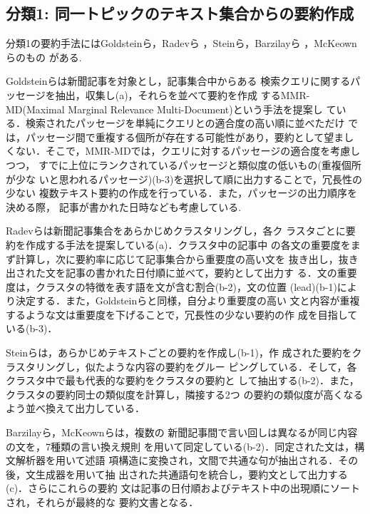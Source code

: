 \subsection*{分類1: 同一トピックのテキスト集合からの要約作成}

分類1の要約手法にはGoldsteinら\cite{goldstein:00:a}，Radevら
\cite{radev:00:a}，Steinら\cite{stein:99:a}，Barzilayら
\cite{barzilay:99:a,barzilay:01:a}，McKeownら\cite{mckeown:99:a}のもの
がある.

Goldsteinら\cite{goldstein:00:a}は新聞記事を対象とし，記事集合中からある
検索クエリに関するパッセージを抽出，収集し(a)，それらを並べて要約を作成
するMMR-MD(Maximal Marginal Relevance Multi-Document)という手法を提案し
ている．検索されたパッセージを単純にクエリとの適合度の高い順に並べただけ
では，パッセージ間で重複する個所が存在する可能性があり，要約として望まし
くない．そこで，MMR-MDでは，クエリに対するパッセージの適合度を考慮しつつ，
すでに上位にランクされているパッセージと類似度の低いもの(重複個所が少な
いと思われるパッセージ)(b-3)を選択して順に出力することで，冗長性の少ない
複数テキスト要約の作成を行っている．また，パッセージの出力順序を決める際，
記事が書かれた日時なども考慮している.

Radevら\cite{radev:00:a}は新聞記事集合をあらかじめクラスタリングし，各ク
ラスタごとに要約を作成する手法を提案している(a)．クラスタ中の記事中
の各文の重要度をまず計算し，次に要約率に応じて記事集合から重要度の高い文を
抜き出し，抜き出された文を記事の書かれた日付順に並べて，要約として出力す
る．文の重要度は，クラスタの特徴を表す語を文が含む割合(b-2)，文の位置
(lead)(b-1)により決定する．また，Goldsteinらと同様，自分より重要度の高い
文と内容が重複するような文は重要度を下げることで，冗長性の少ない要約の作
成を目指している(b-3)．

Steinら\cite{stein:99:a}は，あらかじめテキストごとの要約を作成し(b-1)，作
成された要約をクラスタリングし，似たような内容の要約をグルー
ピングしている．そして，各クラスタ中で最も代表的な要約をクラスタの要約と
して抽出する(b-2)．また，クラスタの要約同士の類似度を計算し，隣接する2つ
の要約の類似度が高くなるよう並べ換えて出力している．

Barzilayら\cite{barzilay:99:a}，McKeownら\cite{mckeown:99:a}は，複数の
新聞記事間で言い回しは異なるが同じ内容の文を，7種類の言い換え規則
を用いて同定している(b-2)．同定された文は，構文解析器を用いて述語
項構造に変換され，文間で共通な句が抽出される．その後，文生成器を用いて抽
出された共通語句を統合し，要約文として出力する(c)．さらにこれらの要約
文は記事の日付順およびテキスト中の出現順にソートされ，それらが最終的な
要約文書となる．

